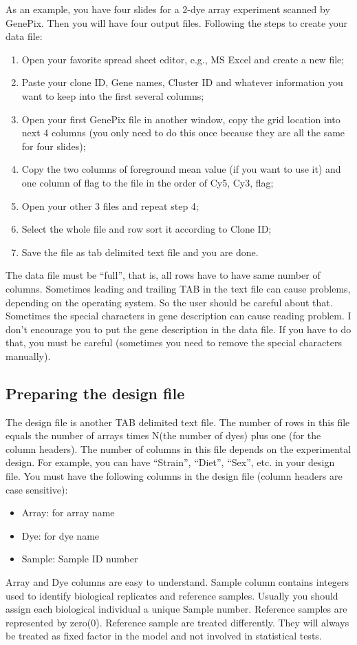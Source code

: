 As an example, you have four slides for a 2-dye array experiment 
scanned by GenePix. Then you will have four
output files. Following the steps to create your data file:
\begin{enumerate}
\item Open your favorite spread sheet editor, e.g., MS Excel and 
create a new file;
\item Paste your clone ID, Gene names, Cluster ID and whatever
information you want to keep into the first several columns;
\item Open your first GenePix file in another window, 
copy the grid location into next 4 columns 
(you only need to do this once because they are all the same for
four slides);
\item Copy the two columns of foreground mean value 
(if you want to use it) and one column of flag to the file in
the order of Cy5, Cy3, flag;
\item Open your other 3 files and repeat step 4;
\item Select the whole file and row sort it according to Clone ID;
\item Save the file as tab delimited text file and you are done. 
\end{enumerate}

The data file must be ``full'', that is, all rows have to have same number of
columns. Sometimes leading and trailing TAB in the text file can cause
problems, depending on the operating system. So the user should be careful
about that. Sometimes the special characters in gene description can
cause reading problem. I don't encourage you to put the gene description
in the data file. If you have to do that, you must be careful (sometimes
you need to remove the special characters manually).

\subsection{Preparing the design file}
The design file is another TAB delimited text file. 
The number of rows in this file
equals the number of arrays times N(the number of dyes) plus one 
(for the column headers). 
The number of columns in this file depends
on the experimental design. For example, you can have ``Strain'', ``Diet'',
``Sex'', etc. in your design file. 
You must have the following columns in the design file (column headers
are case sensitive):
\begin{itemize}
\item Array: for array name
\item Dye: for dye name
\item Sample: Sample ID number
\end{itemize}
Array and Dye columns are easy to understand. Sample column 
contains integers used to identify biological replicates 
and reference samples. Usually you should assign each biological
individual a unique Sample number. Reference samples are 
represented by zero(0). Reference sample are treated differently.
They will always be treated as fixed factor in the model
and not involved in statistical tests.


